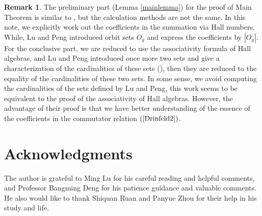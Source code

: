 \documentclass[reqno,12pt]{amsart}
\numberwithin{equation}{section}
\def\Ext{\mbox{\rm Ext}\,} \def\Hom{\mbox{\rm Hom}} \def\dim{\mbox{\rm dim}\,} \def\Iso{\mbox{\rm Iso}\,}
\def\A{{\mathcal A}}\def\P{{\mathscr{P}}}
\theoremstyle{plain} %
\theoremstyle{definition} %
\newtheorem{remark}[theorem]{\bf Remark}
\begin{document}
\begin{remark}
The preliminary part (Lemma \ref{mainlemma}) for the proof of Main Theorem is similar to \cite[Lemma 4.9]{LP}, but the calculation methods are not the same. In this note, we explicitly work out the coefficients in the summation via Hall numbers. While, Lu and Peng introduced orbit sets $O_g$ and express the coefficients by $|O_g|$. For the conclusive part, we are reduced to use the associativity formula of Hall algebras, and Lu and Peng introduced once more two sets and give a characterization of the cardinalities of these sets (\cite[Lemma 4.10]{LP}), then they are reduced to the equality of the cardinalities of these two sets. In some sense, we avoid computing the cardinalities of the sets defined by Lu and Peng, this work seems to be equivalent to the proof of the associativity of Hall algebras. However, the advantage of their proof is that we have better understanding of the essence of the coefficients in the commutator relation $(\ref{Drinfeld2})$.
\end{remark}


%
%
%
%
%

\section*{Acknowledgments}

The author is grateful to Ming Lu for his careful reading and helpful comments, and Professor Bangming Deng for his patience guidance and valuable comments. He also would like to thank Shiquan Ruan and Panyue Zhou for their help in his study and life.
\end{document}
